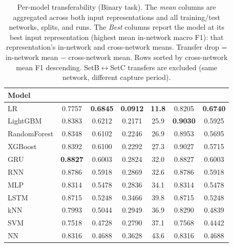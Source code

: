 \begin{table}
    \centering
    \caption{Per-model transferability (Binary task). The \emph{mean} columns are aggregated across both input representations and all training/test networks, splits, and runs. The \emph{Best} columns report the model at its best input representation (highest mean in-network macro F1): that representation's in-network and cross-network means. Transfer drop = in-network mean $-$ cross-network mean. Rows sorted by cross-network mean F1 descending. SetB$\leftrightarrow$SetC transfers are excluded (same network, different capture period).}
    \label{tab:q3_per_model_binary}


    \begin{tabular}{
        l
        S[table-format=1.4]
        S[table-format=1.4]
        S[table-format=1.4]
        S[table-format=2.1]
        S[table-format=1.4]
        S[table-format=1.4]
    }
    \toprule
    \textbf{Model} & {} & {} & {} & {} & {} & {} \\
    \midrule
    LR & 0.7757 & \textbf{0.6845} & \textbf{0.0912} & \textbf{11.8} & 0.8205 & \textbf{0.6740} \\
    LightGBM & 0.8383 & 0.6212 & 0.2171 & 25.9 & \textbf{0.9030} & 0.5925 \\
    RandomForest & 0.8348 & 0.6102 & 0.2246 & 26.9 & 0.8953 & 0.5695 \\
    XGBoost & 0.8392 & 0.6100 & 0.2292 & 27.3 & 0.9027 & 0.5715 \\
    GRU & \textbf{0.8827} & 0.6003 & 0.2824 & 32.0 & 0.8827 & 0.6003 \\
    RNN & 0.8786 & 0.5918 & 0.2869 & 32.6 & 0.8786 & 0.5918 \\
    MLP & 0.8314 & 0.5478 & 0.2836 & 34.1 & 0.8314 & 0.5478 \\
    LSTM & 0.8715 & 0.5248 & 0.3466 & 39.8 & 0.8715 & 0.5248 \\
    kNN & 0.7993 & 0.5044 & 0.2949 & 36.9 & 0.8290 & 0.4839 \\
    SVM & 0.7518 & 0.4728 & 0.2790 & 37.1 & 0.7568 & 0.4442 \\
    NN & 0.8316 & 0.4688 & 0.3628 & 43.6 & 0.8316 & 0.4688 \\
    \bottomrule
    \end{tabular}
\end{table}
